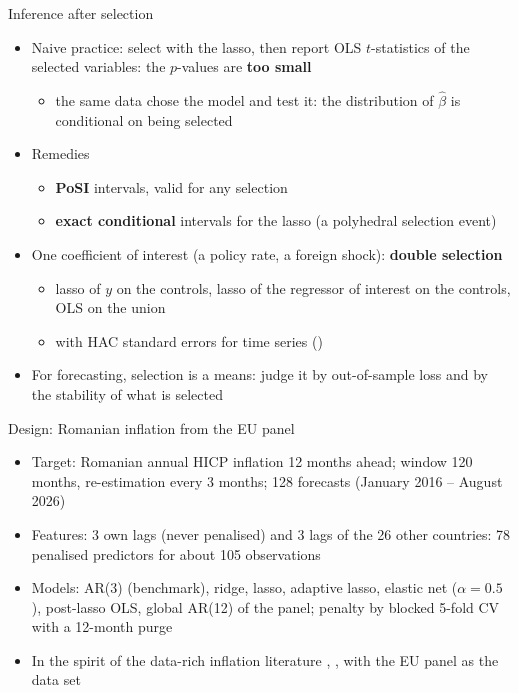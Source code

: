 \begin{frame}{Inference after selection}
\itemsize{\small}
\begin{itemize}
    \item Naive practice: select with the lasso, then report OLS $t$-statistics of the selected variables: the $p$-values are \textbf{too small}
    \begin{itemize}
        \item the same data chose the model and test it: the distribution of $\hat\beta$ is conditional on being selected
    \end{itemize}
    \item Remedies
    \begin{itemize}
        \item \textbf{PoSI} intervals, valid for any selection 
        \item \textbf{exact conditional} intervals for the lasso (a polyhedral selection event) 
    \end{itemize}
    \item One coefficient of interest (a policy rate, a foreign shock): \textbf{double selection} 
    \begin{itemize}
        \item lasso of $y$ on the controls, lasso of the regressor of interest on the controls, OLS on the union
        \item with HAC standard errors for time series ()
    \end{itemize}
    \item For forecasting, selection is a means: judge it by out-of-sample loss and by the stability of what is selected
\end{itemize}
\end{frame}

\begin{frame}{Design: Romanian inflation from the EU panel}
\itemsize{\small}
\begin{itemize}
    \item Target: Romanian annual HICP inflation 12 months ahead; window 120 months, re-estimation every 3 months; 128 forecasts (January 2016 -- August 2026)
    \item Features: 3 own lags (never penalised) and 3 lags of the 26 other countries: 78 penalised predictors for about 105 observations
    \item Models: AR(3) (benchmark), ridge, lasso, adaptive lasso, elastic net ($\alpha = 0.5$), post-lasso OLS, global AR(12) of the panel; penalty by blocked 5-fold CV with a 12-month purge
    \item In the spirit of the data-rich inflation literature , , with the EU panel as the data set
\end{itemize}
\end{frame}

